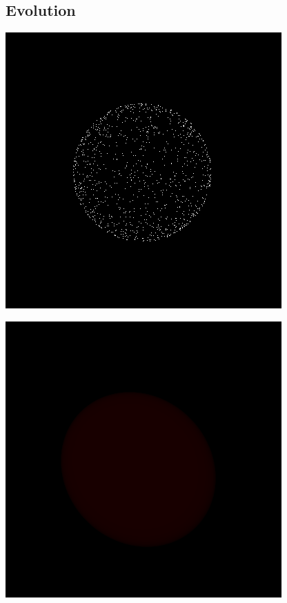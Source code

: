 \documentclass[a4paper]{article}
\begin{document}
\subsection{Evolution}
\begin{center}
	\includegraphics[scale=0.50]{images/gallery/photon_projection.png}
	\label{fig:photon_projection}
\end{center}

\begin{center}
	\includegraphics[scale=0.50]{images/gallery/ray_casting.png}
	\label{fig:ray_projection}
\end{center}
\end{document}
